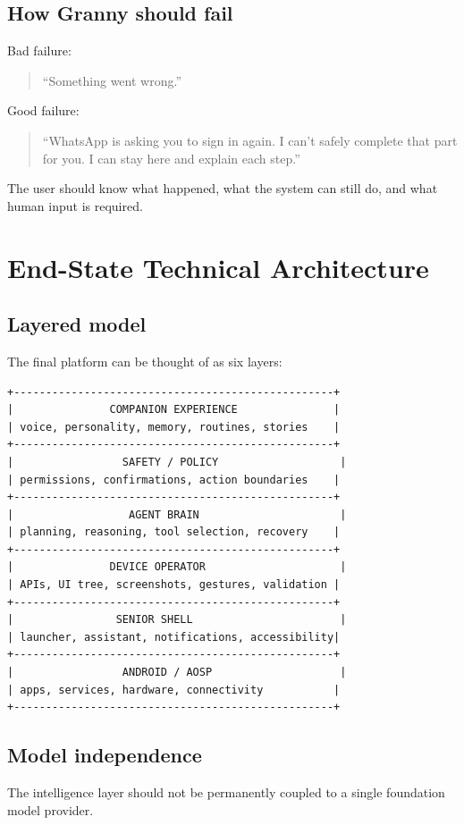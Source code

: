 \documentclass[11pt]{article}
\begin{document}
\subsection{How Granny should fail}
Bad failure:

\begin{quote}
``Something went wrong.''
\end{quote}

Good failure:

\begin{quote}
``WhatsApp is asking you to sign in again. I can't safely complete that part for you. I can stay here and explain each step.''
\end{quote}

The user should know what happened, what the system can still do, and what human input is required.

\section{End-State Technical Architecture}

\subsection{Layered model}
The final platform can be thought of as six layers:

\begin{verbatim}
+--------------------------------------------------+
|               COMPANION EXPERIENCE               |
| voice, personality, memory, routines, stories    |
+--------------------------------------------------+
|                 SAFETY / POLICY                   |
| permissions, confirmations, action boundaries    |
+--------------------------------------------------+
|                  AGENT BRAIN                      |
| planning, reasoning, tool selection, recovery    |
+--------------------------------------------------+
|               DEVICE OPERATOR                     |
| APIs, UI tree, screenshots, gestures, validation |
+--------------------------------------------------+
|                SENIOR SHELL                       |
| launcher, assistant, notifications, accessibility|
+--------------------------------------------------+
|                 ANDROID / AOSP                    |
| apps, services, hardware, connectivity           |
+--------------------------------------------------+
\end{verbatim}

\subsection{Model independence}
The intelligence layer should not be permanently coupled to a single foundation model provider.
\end{document}
